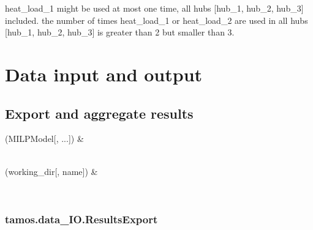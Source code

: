 \documentclass[letterpaper,10pt,english]{sphinxmanual}
\begin{document}
\begin{fulllineitems}
\sphinxAtStartPar
heat\_load\_1 might be used at most one time, all hubs {[}hub\_1, hub\_2, hub\_3{]} included.
the number of times heat\_load\_1 or heat\_load\_2 are used in all hubs {[}hub\_1, hub\_2, hub\_3{]}
is greater than 2 but smaller than 3.

\end{fulllineitems}


\sphinxstepscope


\chapter{Data input and output}
\label{\detokenize{data_IO:data-input-and-output}}\label{\detokenize{data_IO::doc}}

\section{Export and aggregate results}
\label{\detokenize{data_IO:export-and-aggregate-results}}

\begin{savenotes}\sphinxattablestart
\centering
\begin{tabulary}{\linewidth}[t]{}
\hline

\sphinxAtStartPar
{\hyperref[\detokenize{generated/tamos.data_IO.ResultsExport:tamos.data_IO.ResultsExport}]{}}(MILPModel{[}, ...{]})
&
\sphinxAtStartPar

\\
\hline
\sphinxAtStartPar
{\hyperref[\detokenize{generated/tamos.data_IO.ResultsBatch:tamos.data_IO.ResultsBatch}]{}}(working\_dir{[}, name{]})
&
\sphinxAtStartPar

\\
\hline
\end{tabulary}
\par
\sphinxattableend\end{savenotes}

\sphinxstepscope


\subsection{tamos.data\_IO.ResultsExport}
\label{\detokenize{generated/tamos.data_IO.ResultsExport:tamos-data-io-resultsexport}}\label{\detokenize{generated/tamos.data_IO.ResultsExport::doc}}
\end{document}
